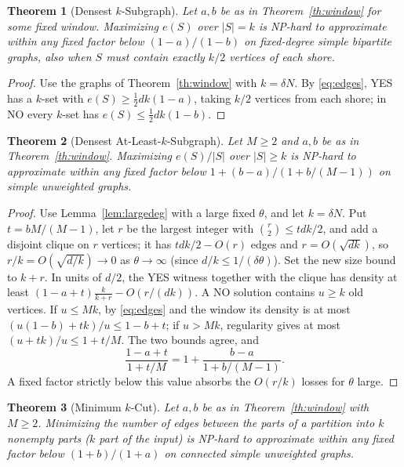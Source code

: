 \documentclass[11pt,letterpaper]{article}
\newtheorem{theorem}{Theorem}[section]
\theoremstyle{definition}
\theoremstyle{remark}
\begin{document}
\begin{theorem}[Densest \(k\)-Subgraph]\label{th:dks}
Let \(a,b\) be as in Theorem~\ref{th:window} for some fixed window. Maximizing
\(e(S)\) over \(|S|=k\) is NP-hard to approximate within any fixed factor
below \((1-a)/(1-b)\) on fixed-degree simple bipartite graphs, also when
\(S\) must contain exactly \(k/2\) vertices of each shore.
\end{theorem}

\begin{proof}
Use the graphs of Theorem~\ref{th:window} with \(k=\delta N\). By
\eqref{eq:edges}, YES has a \(k\)-set with \(e(S)\ge\frac12dk(1-a)\), taking
\(k/2\) vertices from each shore; in NO every \(k\)-set has
\(e(S)\le\frac12dk(1-b)\).
\end{proof}

\begin{theorem}[Densest At-Least-\(k\)-Subgraph]\label{th:dalks}
Let \(M\ge2\) and \(a,b\) be as in Theorem~\ref{th:window}. Maximizing
\(e(S)/|S|\) over \(|S|\ge k\) is NP-hard to approximate within any fixed
factor below \(1+(b-a)/(1+b/(M-1))\) on simple unweighted graphs.
\end{theorem}

\begin{proof}
Use Lemma~\ref{lem:largedeg} with a large fixed \(\theta\), and let
\(k=\delta N\). Put \(t=bM/(M-1)\), let \(r\) be the largest integer with
\(\binom r2\le tdk/2\), and add a disjoint clique on \(r\) vertices; it has
\(tdk/2-O(r)\) edges and \(r=O(\sqrt{dk})\), so \(r/k=O(\sqrt{d/k})\to0\) as
\(\theta\to\infty\) (since \(d/k\le1/(\delta\theta)\)). Set the new size bound
to \(k+r\). In units of \(d/2\), the YES witness together with the clique
has density at least \((1-a+t)\frac{k}{k+r}-O(r/(dk))\). A NO solution
contains \(u\ge k\) old vertices. If \(u\le Mk\), by \eqref{eq:edges} and the
window its density is at most \((u(1-b)+tk)/u\le1-b+t\); if \(u>Mk\),
regularity gives at most \((u+tk)/u\le1+t/M\). The two bounds agree, and
\[
\frac{1-a+t}{1+t/M}=1+\frac{b-a}{1+b/(M-1)} .
\]
A fixed factor strictly below this value absorbs the \(O(r/k)\) losses for
\(\theta\) large.
\end{proof}

\begin{theorem}[Minimum \(k\)-Cut]\label{th:kcut}
Let \(a,b\) be as in Theorem~\ref{th:window} with \(M\ge2\). Minimizing the
number of edges between the parts of a partition into \(k\) nonempty parts
(\(k\) part of the input) is NP-hard to approximate within any fixed factor
below \((1+b)/(1+a)\) on connected simple unweighted graphs.
\end{theorem}
\end{document}
